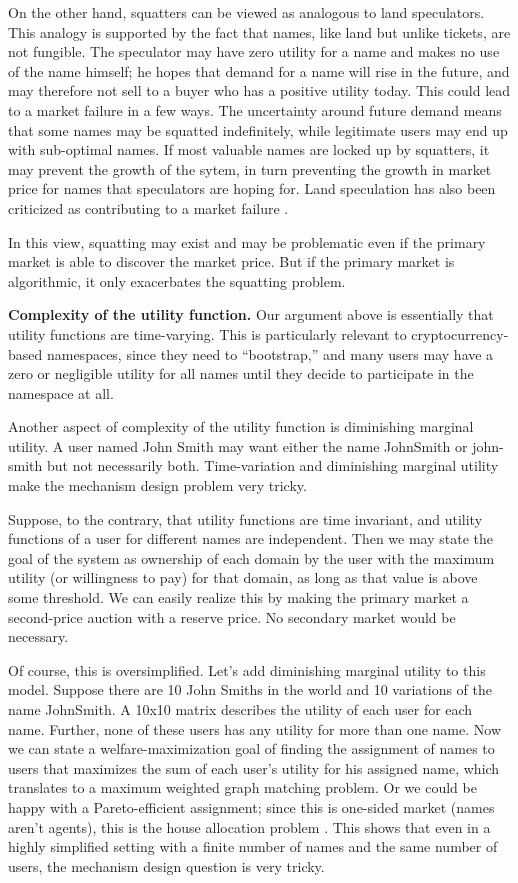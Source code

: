 On the other hand, squatters can be viewed as analogous to land speculators. This analogy is supported by the fact that names, like land but unlike tickets, are not fungible. The speculator may have zero utility for a name and makes no use of the name himself; he hopes that demand for a name will rise in the future, and may therefore not sell to a buyer who has a positive utility today. This could lead to a market failure in a few ways. The uncertainty around future demand means that some names may be squatted indefinitely, while legitimate users may end up with sub-optimal names. If most valuable names are locked up by squatters, it may prevent the growth of the sytem, in turn preventing the growth in market price for names that speculators are hoping for. Land speculation has also been criticized as contributing to a market failure \cite{archer73}. 


In this view, squatting may exist and may be problematic even if the primary market is able to discover the market price. But if the primary market is algorithmic, it only exacerbates the squatting problem.


{\bf Complexity of the utility function.} 
Our argument above is essentially that utility functions are time-varying. This is particularly relevant to cryptocurrency-based namespaces, since they need to ``bootstrap,'' \hi{[explain]} and many users may have a zero or negligible utility for all names until they decide to participate in the namespace at all.

Another aspect of complexity of the utility function is diminishing marginal utility. A user named John Smith may want either the name \textsf{JohnSmith} or \textsf{john-smith} but not necessarily both. Time-variation and diminishing marginal utility make the mechanism design problem very tricky.

Suppose, to the contrary, that utility functions are time invariant, and utility functions of a user for different names are independent. Then we may state the goal of the system as ownership of each domain by the user with the maximum utility (or willingness to pay) for that domain, as long as that value is above some threshold. We can easily realize this by making the primary market a second-price auction with a reserve price. No secondary market would be necessary.

Of course, this is oversimplified. Let's add diminishing marginal utility to this model. Suppose there are 10 John Smiths in the world and 10 variations of the name \textsf{JohnSmith}. A 10x10 matrix describes the utility of each user for each name. Further, none of these users has any utility for more than one name. Now we can state a welfare-maximization goal of finding the assignment of names to users that maximizes the sum of each user's utility for his assigned name, which translates to a maximum weighted graph matching problem. Or we could be happy with a Pareto-efficient assignment; since this is one-sided market (names aren't agents), this is the house allocation problem \cite{matching-markets-theory-practice}. This shows that even in a highly simplified setting with a finite number of names and the same number of users, the mechanism design question is very tricky.

